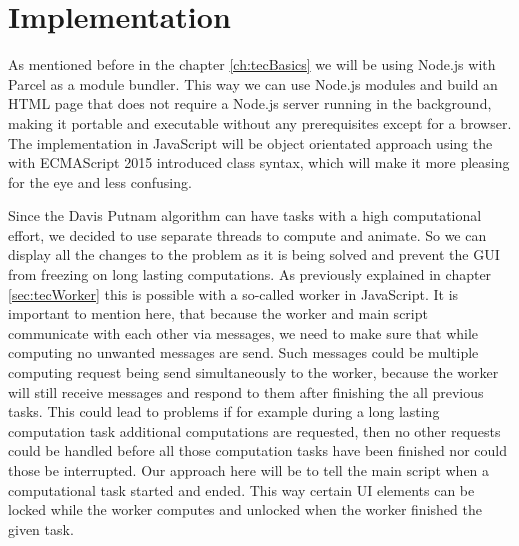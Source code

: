 
\chapter{Implementation}
\label{ch:implementation}
As mentioned before in the chapter \ref{ch:tecBasics} we will be using Node.js with Parcel as a module bundler. This way we can use Node.js modules and build an HTML page that does not require a Node.js server running in the background, making it portable and executable without any prerequisites except for a browser. The implementation in JavaScript will be object orientated approach using the with ECMAScript 2015 introduced class syntax, which will make it more pleasing for the eye and less confusing.

Since the Davis Putnam algorithm can have tasks with a high computational effort, we decided to use separate threads to compute and animate. So we can display all the changes to the problem as it is being solved and prevent the GUI from freezing on long lasting computations. As previously explained in chapter \ref{sec:tecWorker} this is possible with a so-called worker in JavaScript. It is important to mention here, that because the worker and main script communicate with each other via messages, we need to make sure that while computing no unwanted messages are send. Such messages could be multiple computing request being send simultaneously to the worker, because the worker will still receive messages and respond to them after finishing the all previous tasks. This could lead to problems if for example during a long lasting computation task additional computations are requested, then no other requests could be handled before all those computation tasks have been finished nor could those be interrupted. Our approach here will be to tell the main script when a computational task started and ended. This way certain UI elements can be locked while the worker computes and unlocked when the worker finished the given task.

